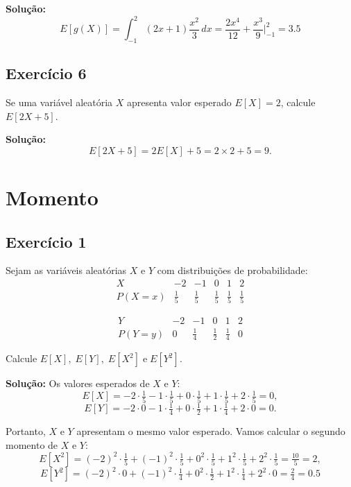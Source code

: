 \documentclass{article}
\begin{document}
\vspace{0.5cm}
\textbf{Solução:}
    $$
    E[g(X)] = \int_{-1}^2 (2x+1)\dfrac{x^2}{3}\, dx 
    = \dfrac{2x^4}{12} + \dfrac{x^3}{9}\Bigg|_{-1}^2
    = 3.5
    $$

\subsection{Exercício 6}
Se uma variável aleatória $X$ apresenta valor esperado $E[X] = 2$, calcule $E[2X+5]$.

\vspace{0.5cm}
\textbf{Solução:}
    $$
    E[2X+5] = 2E[X] + 5 = 2 \times 2 + 5 = 9.
    $$

\section{Momento}
\subsection{Exercício 1}
Sejam as variáveis aleatórias $X$ e $Y$ com distribuições de probabilidade:
    $$
    \begin{array}{c|ccccc}
    X & -2 & -1 & 0 & 1 & 2 \\ \hline
    P(X=x) & \tfrac{1}{5} & \tfrac{1}{5} & \tfrac{1}{5} & \tfrac{1}{5} & \tfrac{1}{5}
    \end{array}
    $$
    
    $$
    \begin{array}{c|ccccc}
    Y & -2 & -1 & 0 & 1 & 2 \\ \hline
    P(Y=y) & 0 & \tfrac{1}{4} & \tfrac{1}{2} & \tfrac{1}{4} & 0
    \end{array}
    $$

Calcule $E[X], \; E[Y], \; E[X^2] \; \text{e} \; E[Y^2]$.

\vspace{0.5cm}
\textbf{Solução:} Os valores esperados de $X$ e $Y$:
    $$
    E[X] = -2 \cdot \tfrac{1}{5} - 1 \cdot \tfrac{1}{5} + 0 \cdot \tfrac{1}{5} + 1 \cdot \tfrac{1}{5} + 2 \cdot \tfrac{1}{5} = 0,
    $$
    $$
    E[Y] = -2 \cdot 0 - 1 \cdot \tfrac{1}{4} + 0 \cdot \tfrac{1}{2} + 1 \cdot \tfrac{1}{4} + 2 \cdot 0 = 0.
    $$

Portanto, $X$ e $Y$ apresentam o mesmo valor esperado.  
Vamos calcular o segundo momento de $X$ e $Y$:
    $$
    E[X^2] = (-2)^2 \cdot \tfrac{1}{5} + (-1)^2 \cdot \tfrac{1}{5} + 0^2 \cdot \tfrac{1}{5} + 1^2 \cdot \tfrac{1}{5} + 2^2 \cdot \tfrac{1}{5} = \tfrac{10}{5} = 2,
    $$
    $$
    E[Y^2] = (-2)^2 \cdot 0 + (-1)^2 \cdot \tfrac{1}{4} + 0^2 \cdot \tfrac{1}{2} + 1^2 \cdot \tfrac{1}{4} + 2^2 \cdot 0 = \tfrac{2}{4} = 0.5
    $$
\end{document}

